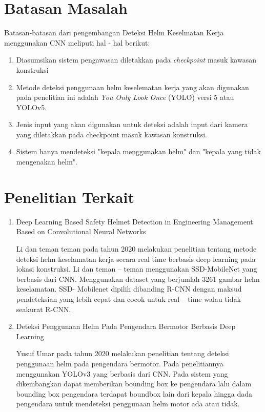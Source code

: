\section{Batasan Masalah}
\label{sec:batasanmasalah}

Batasan-batasan dari pengembangan Deteksi Helm Keselmatan Kerja menggunakan CNN meliputi hal - hal berikut:

\begin{enumerate}[nolistsep]

  \item Diasumsikan sistem pengawasan diletakkan pada \emph{checkpoint} masuk kawasan konstruksi

  \item Metode deteksi penggunaan helm keselematan kerja yang akan digunakan pada penelitian ini adalah \emph{You Only Look Once} (YOLO) versi 5 atau YOLOv5.

  \item Jenis input yang akan digunakan untuk deteksi adalah input dari kamera yang diletakkan pada checkpoint masuk kawasan konstruksi.
  \item Sistem hanya mendeteksi "kepala menggunakan helm" dan "kepala yang tidak mengenakan helm".

\end{enumerate}

\section{Penelitian Terkait}
\begin{enumerate}
  \item Deep Learning Based Safety Helmet Detection in Engineering Management Based on Convolutional Neural Networks 
  \par Li dan teman teman pada tahun 2020 melakukan penelitian tentang metode deteksi helm keselamatan kerja secara real time berbasis deep learning pada lokasi konstruksi. Li dan teman – teman menggunakan SSD-MobileNet yang berbasis dari CNN. Menggunakan dataset yang berjumlah 3261 gambar helm keselamatan. SSD- Mobilenet dipilih dibanding R-CNN dengan maksud pendeteksian yang lebih cepat dan cocok untuk real – time walau tidak seakurat R-CNN. \cite{li2020deep}
  
  \item Deteksi Penggunaan Helm Pada Pengendara Bermotor Berbasis Deep Learning 
  \par Yusuf Umar pada tahun 2020 melakukan penelitian tentang deteksi penggunaan helm pada pengendara bermotor. Pada penelitiannya menggunakan YOLOv3 yang berbasis dari CNN. Pada sistem yang dikembangkan dapat memberikan bounding box ke pengendara lalu dalam bounding box pengendara terdapat boundbox lain dari kepala hingga dada pengendara untuk mendeteksi penggunaan helm motor ada atau tidak. \cite{hanafi2020deteksi}
\end{enumerate}

